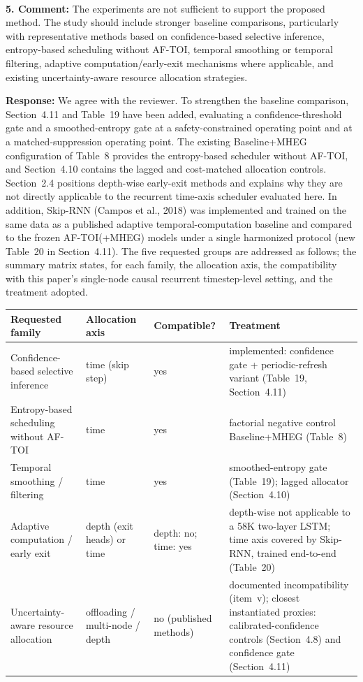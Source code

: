 \documentclass[1p,12pt,authoryear]{elsarticle}
\begin{document}
~

\noindent \textbf{5. Comment:} The experiments are not sufficient to support the proposed method. The study should include stronger baseline comparisons, particularly with representative methods based on confidence-based selective inference, entropy-based scheduling without AF-TOI, temporal smoothing or temporal filtering, adaptive computation/early-exit mechanisms where applicable, and existing uncertainty-aware resource allocation strategies.

\vspace{2mm}
\noindent \textbf{Response:} We agree with the reviewer. To strengthen the baseline comparison, Section~4.11 and Table~19 have been added, evaluating a confidence-threshold gate and a smoothed-entropy gate at a safety-constrained operating point and at a matched-suppression operating point. The existing Baseline+MHEG configuration of Table~8 provides the entropy-based scheduler without AF-TOI, and Section~4.10 contains the lagged and cost-matched allocation controls. Section~2.4 positions depth-wise early-exit methods and explains why they are not directly applicable to the recurrent time-axis scheduler evaluated here. In addition, Skip-RNN (Campos et al., 2018) was implemented and trained on the same data as a published adaptive temporal-computation baseline and compared to the frozen AF-TOI(+MHEG) models under a single harmonized protocol (new Table~20 in Section~4.11). The five requested groups are addressed as follows; the summary matrix
states, for each family, the allocation axis, the compatibility with this
paper's single-node causal recurrent timestep-level setting, and the
treatment adopted.

\begin{center}\footnotesize
\begin{tabular}{p{3.3cm} p{2.5cm} p{2.3cm} p{4.8cm}}
\hline
\textbf{Requested family} & \textbf{Allocation axis} & \textbf{Compatible?} & \textbf{Treatment} \\
\hline
Confidence-based selective inference & time (skip step) & yes & implemented: confidence gate + periodic-refresh variant (Table~19, Section~4.11) \\
Entropy-based scheduling without AF-TOI & time & yes & factorial negative control Baseline+MHEG (Table~8) \\
Temporal smoothing / filtering & time & yes & smoothed-entropy gate (Table~19); lagged allocator (Section~4.10) \\
Adaptive computation / early exit & depth (exit heads) or time & depth: no; time: yes & depth-wise not applicable to a 58K two-layer LSTM; time axis covered by Skip-RNN, trained end-to-end (Table~20) \\
Uncertainty-aware resource allocation & offloading / multi-node / depth & no (published methods) & documented incompatibility (item~v); closest instantiated proxies: calibrated-confidence controls (Section~4.8) and confidence gate (Section~4.11) \\
\hline
\end{tabular}
\end{center}
\end{document}
